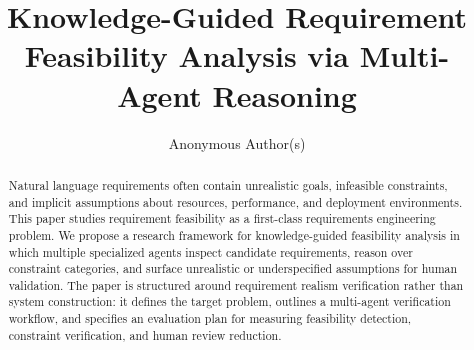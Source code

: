 \documentclass[sigconf,anonymous,review]{acmart}
\title{Knowledge-Guided Requirement Feasibility Analysis via Multi-Agent Reasoning}
\author{Anonymous Author(s)}
\affiliation{
  \institution{Anonymous Institution}
  \country{Anonymous Country}
}
\begin{document}
\begin{abstract}
Natural language requirements often contain unrealistic goals, infeasible constraints, and implicit assumptions about resources, performance, and deployment environments.
This paper studies requirement feasibility as a first-class requirements engineering problem.
We propose a research framework for knowledge-guided feasibility analysis in which multiple specialized agents inspect candidate requirements, reason over constraint categories, and surface unrealistic or underspecified assumptions for human validation.
The paper is structured around requirement realism verification rather than system construction: it defines the target problem, outlines a multi-agent verification workflow, and specifies an evaluation plan for measuring feasibility detection, constraint verification, and human review reduction.
\end{abstract}



\maketitle



















\appendix



\end{document}
